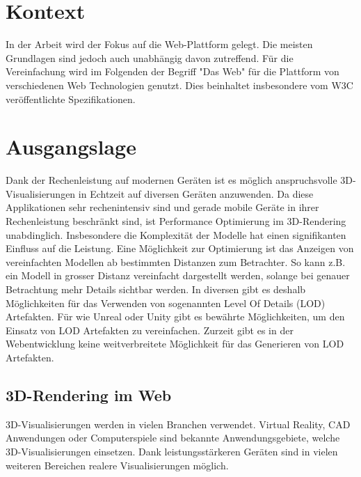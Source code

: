 
\section{Kontext}
In der Arbeit wird der Fokus auf die Web-Plattform gelegt. Die meisten Grundlagen sind jedoch auch unabhängig davon zutreffend.
Für die Vereinfachung wird im Folgenden der Begriff "Das Web" für die Plattform von verschiedenen Web Technologien genutzt. Dies beinhaltet insbesondere vom W3C veröffentlichte Spezifikationen.

\section{Ausgangslage}
Dank der Rechenleistung auf modernen Geräten ist es möglich anspruchsvolle 3D-Visualisierungen in Echtzeit auf diversen Geräten anzuwenden. Da diese Applikationen sehr rechenintensiv sind und gerade mobile Geräte in ihrer Rechenleistung beschränkt sind, ist Performance Optimierung im 3D-Rendering unabdinglich. Insbesondere die Komplexität der Modelle hat einen signifikanten Einfluss auf die Leistung.
Eine Möglichkeit zur Optimierung ist das Anzeigen von vereinfachten Modellen ab bestimmten Distanzen zum Betrachter. So kann z.B. ein Modell in grosser Distanz vereinfacht dargestellt werden, solange bei genauer Betrachtung mehr Details sichtbar werden.
In diversen  gibt es deshalb Möglichkeiten für das Verwenden von sogenannten Level Of Details (LOD) Artefakten.
Für  wie Unreal oder Unity gibt es bewährte Möglichkeiten, um den Einsatz von LOD Artefakten zu vereinfachen. Zurzeit gibt es in der Webentwicklung keine weitverbreitete Möglichkeit für das Generieren von LOD Artefakten.

\subsection{3D-Rendering im Web}
3D-Visualisierungen werden in vielen Branchen verwendet.
Virtual Reality, CAD Anwendungen oder Computerspiele sind bekannte Anwendungsgebiete, welche 3D-Visualisierungen einsetzen.
Dank leistungsstärkeren Geräten sind in vielen weiteren Bereichen realere Visualisierungen möglich.

